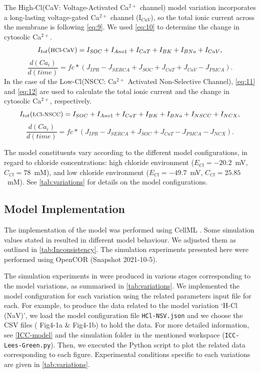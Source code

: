 \documentclass[fleqn,10pt]{physiome}
\begin{document}
The High-Cl(CaV: Voltage-Activated Ca$^{2+}$ channel) model variation incorporates a long-lasting voltage-gated Ca$^{2+}$ channel (I$_{CaV}$), so the total ionic current across the membrane is following \autoref{eq:9}. We used \autoref{eq:10} to determine the change in cytosolic Ca$^{2+}$.
\begin{equation}
I_{tot}(\text{\footnotesize{HCl-CaV}}) = I_{SOC}+I_{Ano1}+I_{CaT}+I_{BK}+I_{BNa}+I_{CaV}, \label{eq:9}
\end{equation}
\begin{equation}
\frac {d(Ca_{i})}{d(time)}= fc*(J_{IPR}-J_{SERCA}+J_{SOC}+J_{CaT}+J_{CaV}-J_{PMCA}).\label{eq:10}    
\end{equation}
In the case of the Low-Cl(NSCC: Ca$^{2+}$ Activated Non-Selective Channel), \autoref{eq:11} and \autoref{eq:12} are used to calculate the total ionic current and the change in cytosolic Ca$^{2+}$, respectively.
\begin{equation}
I_{tot}(\text{\footnotesize{LCl-NSCC}}) = I_{SOC}+I_{Ano1}+I_{CaT}+I_{BK}+I_{BNa}+I_{NSCC}+I_{NCX},\label{eq:11}
\end{equation}
\begin{equation}
\frac {d(Ca_{i})}{d(time)} = fc*(J_{IPR}-J_{SERCA}+J_{SOC}+J_{CaT}-J_{PMCA}-J_{NCX}). \label{eq:12}    
\end{equation}

The model constituents vary according to the different model configurations, in regard to chloride concentrations: high chloride environment ($E_{Cl} = - 20.2$~mV, $C_{Cl} = 78$~mM), and low chloride environment ($E_{Cl} = - 49.7$~mV, $C_{Cl} = 25.85$~mM). See \autoref{tab:variations} for details on the model configurations.


\subsection{Model Implementation}
The implementation of the model was performed using CellML \citep{doi:10.1177/0037549703040939}. Some simulation values stated in \citet{lees2014computational} resulted in different model behaviour. We adjusted them as outlined in \autoref{tab:Inconsistency}. The simulation experiments presented here were performed using OpenCOR (Snapshot 2021-10-5).

The simulation experiments in \citet[Figures 4 \& 5 ]{lees2014computational} were produced in various stages corresponding to the model variations, as summarised in \autoref{tab:variations}. We implemented the model configuration for each variation using the related parameters input file for each. For example, to produce the data related to the model variation `H-Cl (NaV)', we load the model configuration file \texttt{HCl-NSV.json} and we choose the CSV files ( Fig4-1a \& Fig4-1b) to hold the data. For more detailed information, see \autoref{ICC-model} and the simulation folder in the mentioned workspace (\texttt{ICC-Lees-Green.py}). Then, we executed the Python script to plot the related data corresponding to each figure.
Experimental conditions specific to each variations are given in \autoref{tab:variations}. 
\end{document}
